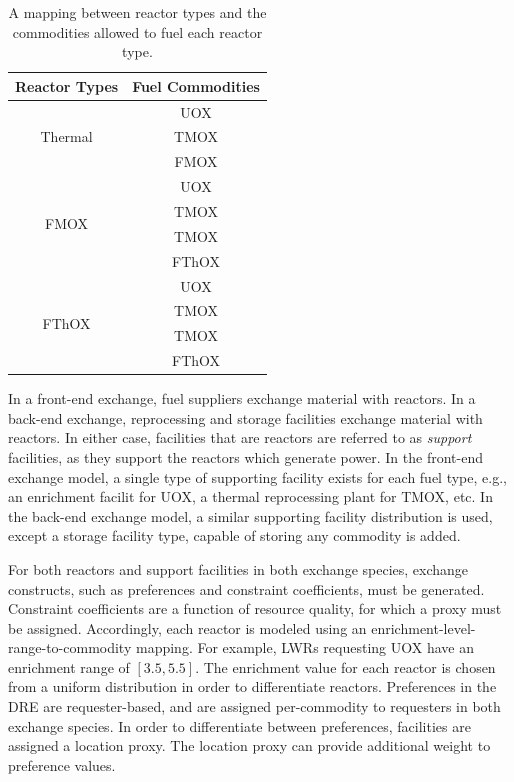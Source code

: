 \documentclass{anstrans}
\begin{document}
\begin{table}[]
\centering
\caption{A mapping between reactor types and the commodities allowed to fuel 
  each reactor type.}
\label{tbl:rx_to_commods}
\begin{tabular}{|c|c|}
\hline
\textbf{Reactor Types}            & \textbf{Fuel Commodities} \\ \hline
\multirow{3}{*}{Thermal}                    & UOX         \\ 
                      & TMOX        \\  
                      & FMOX       \\ \hline
\multirow{4}{*}{FMOX}  & UOX         \\  
                      & TMOX        \\ 
                      & TMOX        \\  
                      & FThOX        \\ \hline 
\multirow{4}{*}{FThOX} & UOX         \\  
                     & TMOX        \\ 
                      & TMOX        \\  
                      & FThOX        \\ \hline 
\end{tabular}
\end{table}

In a front-end exchange, fuel suppliers exchange material with reactors. In a
back-end exchange, reprocessing and storage facilities exchange material with
reactors. In either case, facilities that are  reactors are referred
to as \textit{support} facilities, as they support the reactors which generate
power. In the front-end exchange model, a single type of supporting facility
exists for each fuel type, e.g., an enrichment facilit for UOX, a thermal
reprocessing plant for TMOX, etc. In the back-end exchange model, a similar
supporting facility distribution is used, except a storage facility type,
capable of storing any commodity is added.

For both reactors and support facilities in both exchange species, exchange
constructs, such as preferences and constraint coefficients, must be
generated. Constraint coefficients are a function of resource quality, for which
a proxy must be assigned. Accordingly, each reactor is modeled using an
enrichment-level-range-to-commodity mapping. For example, LWRs requesting UOX
have an enrichment range of $[3.5, 5.5]$. The enrichment value for each reactor
is chosen from a uniform distribution in order to differentiate
reactors. Preferences in the DRE are requester-based, and are assigned
per-commodity to requesters in both exchange species. In order to differentiate
between preferences, facilities are assigned a location proxy. The location
proxy can provide additional weight to preference values.
\end{document}
